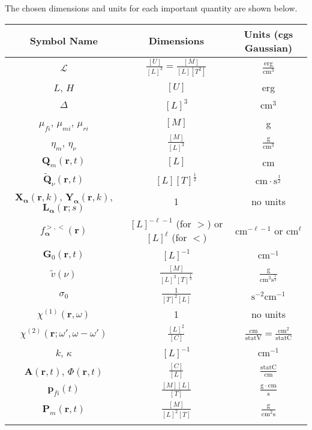 \documentclass{article}
\begin{document}
The chosen dimensions and units for each important quantity are shown below.

\begin{center}
\def\arraystretch{1.5}
\begin{longtable}{c|c|c}
    Symbol Name & Dimensions & Units (cgs Gaussian) \\
    \hline
    $\mathcal{L}$ & $\frac{[U]}{[L]^3} = \frac{[M]}{[L][T^2]}$ & $\frac{\mathrm{erg}}{\mathrm{cm}^3}$\\
    $L$, $H$ & $[U]$ & erg\\
    $\Delta$ & $[L]^3$ & cm$^3$\\
    $\mu_{fi}$, $\mu_{mi}$, $\mu_{ri}$ & $[M]$ & g\\
    $\eta_m$, $\eta_\nu$ & $\frac{[M]}{[L]^3}$ & $\frac{\mathrm{g}}{\mathrm{cm}^3}$\\
    $\mathbf{Q}_m(\mathbf{r},t)$ & $[L]$ & cm\\
    $\tilde{\mathbf{Q}}_\nu(\mathbf{r},t)$ & $[L][T]^\frac{1}{2}$ & $\mathrm{cm}\cdot \mathrm{s}^\frac{1}{2}$\\
    $\mathbf{X}_{\bm{\alpha}}(\mathbf{r},k)$, $\mathbf{Y}_{\bm{\alpha}}(\mathbf{r},k)$, $\mathbf{L}_{\bm{\alpha}}(\mathbf{r};s)$ & 1 & no units\\
    $f_{\bm{\alpha}}^{>,<}(\mathbf{r})$ & $[L]^{-\ell-1}$ (for $>$) or $[L]^{\ell}$ (for $<$) & $\mathrm{cm}^{-\ell-1}$ or $\mathrm{cm}^\ell$\\
    $\mathbf{G}_0(\mathbf{r},t)$ & $[L]^{-1}$ & cm$^{-1}$\\
    $\tilde{v}(\nu)$ & $\frac{[M]}{[L]^3[T]^\frac{1}{2}}$ & $\frac{\mathrm{g}}{\mathrm{cm}^3\mathrm{s}^\frac{1}{2}}$\\
    $\sigma_0$ & $\frac{1}{[T]^2[L]}$ & $\mathrm{s}^{-2}$$\mathrm{cm}^{-1}$\\
    $\chi^{(1)}(\mathbf{r},\omega)$ & 1 & no units\\
    $\chi^{(2)}(\mathbf{r};\omega',\omega - \omega')$ & $\frac{[L]^2}{[C]}$ & $\frac{\mathrm{cm}}{\mathrm{statV}} = \frac{\mathrm{cm}^2}{\mathrm{statC}}$\\
    $k$, $\kappa$ & $[L]^{-1}$ & cm$^{-1}$\\
    $\mathbf{A}(\mathbf{r},t)$, $\Phi(\mathbf{r},t)$ & $\frac{[C]}{[L]}$ & $\frac{\mathrm{statC}}{\mathrm{cm}}$\\
    $\mathbf{p}_{fi}(t)$ & $\frac{[M][L]}{[T]}$ & $\frac{\mathrm{g}\cdot\mathrm{cm}}{\mathrm{s}}$\\
    $\mathbf{P}_m(\mathbf{r},t)$ & $\frac{[M]}{[L]^2[T]}$ & $\frac{\mathrm{g}}{\mathrm{cm}^2\mathrm{s}}$\\
$$
\end{longtable}
\end{center}
\end{document}
